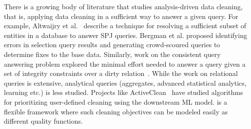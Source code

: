 There is a growing body of literature that studies analysis-driven data cleaning, that is, applying data cleaning in a sufficient way to answer a given query.
For example, Altwaijry et al.~\cite{altwaijry2015query} describe a technique for resolving a sufficient subset of entities in a database to answer SPJ queries.
Bergman et al. \cite{DBLP:conf/sigmod/BergmanMNT15} proposed identifying errors in selection query results and generating crowd-scoured queries to determine fixes to the base data.
Similarly, work on the consistent query answering problem explored the minimal effort needed to answer a query given a set of integrity constraints over a dirty relation~\cite{DBLP:series/synthesis/2011Bertossi}.
While the work on relational queries is extensive, analytical queries (aggregates, advanced statistical analytics, learning etc.) is less studied.
Projects like ActiveClean~\cite{DBLP:journals/pvldb/KrishnanWWFG16} have studied algorithms for prioritizing user-defined cleaning using the downstream ML model.
\sys is a flexible framework where such cleaning objectives can be modeled easily as different quality functions.



